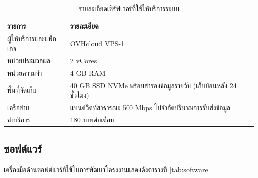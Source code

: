 \nopagebreak
\begin{table}[H]
\centering
\caption{รายละเอียดเซิร์ฟเวอร์ที่ใช้ให้บริการระบบ}
\label{tab:hardware}
\begin{tabular}{|p{4.5cm}|p{8.5cm}|}
\hline
\textbf{รายการ} & \textbf{รายละเอียด} \\
\hline
ผู้ให้บริการและแพ็กเกจ & OVHcloud VPS-1 \\ \hline
หน่วยประมวลผล & 2 vCores \\ \hline
หน่วยความจำ & 4 GB RAM \\ \hline
พื้นที่จัดเก็บ & 40 GB SSD NVMe พร้อมสำรองข้อมูลรายวัน (เก็บย้อนหลัง 24 ชั่วโมง) \\ \hline
เครือข่าย & แบนด์วิดท์สาธารณะ 500 Mbps ไม่จำกัดปริมาณการรับส่งข้อมูล \\ \hline
ค่าบริการ & 180 บาทต่อเดือน \\ \hline
\end{tabular}
\end{table}

\subsection{ซอฟต์แวร์}

เครื่องมือด้านซอฟต์แวร์ที่ใช้ในการพัฒนาโครงงานแสดงดังตารางที่ \ref{tab:software}

